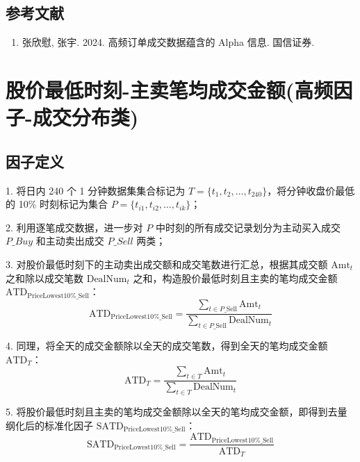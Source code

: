 \documentclass{article}
\begin{document}
\subsection{参考文献}
\begin{enumerate}
    \item 张欣慰, 张宇. 2024. 高频订单成交数据蕴含的 Alpha 信息. 国信证券.
\end{enumerate}

\section{股价最低时刻-主卖笔均成交金额(高频因子-成交分布类)}

\subsection{因子定义}

1. 将日内 240 个 1 分钟数据集集合标记为 \( T = \{t_1, t_2, \dots, t_{240}\} \)，将分钟收盘价最低的 10\% 时刻标记为集合 \( P = \{t_{i1}, t_{i2}, \dots, t_{ik}\} \)；

2. 利用逐笔成交数据，进一步对 \( P \) 中时刻的所有成交记录划分为主动买入成交 \( P\_Buy \) 和主动卖出成交 \( P\_Sell \) 两类；

3. 对股价最低时刻下的主动卖出成交额和成交笔数进行汇总，根据其成交额 \( \mathrm{Amt}_t \) 之和除以成交笔数 \( \mathrm{DealNum}_t \) 之和，构造股价最低时刻且主卖的笔均成交金额 \( \mathrm{ATD}_{\mathrm{PriceLowest10\%\_Sell}} \)：
\begin{equation}
    \mathrm{ATD}_{\mathrm{PriceLowest10\%\_Sell}} = \frac{\sum_{t \in P\_\mathrm{Sell}} \mathrm{Amt}_t}{\sum_{t \in P\_\mathrm{Sell}} \mathrm{DealNum}_t}
\end{equation}

4. 同理，将全天的成交金额除以全天的成交笔数，得到全天的笔均成交金额 \( \mathrm{ATD}_T \)：
\begin{equation}
    \mathrm{ATD}_T = \frac{\sum_{t \in T} \mathrm{Amt}_t}{\sum_{t \in T} \mathrm{DealNum}_t}
\end{equation}

5. 将股价最低时刻且主卖的笔均成交金额除以全天的笔均成交金额，即得到去量纲化后的标准化因子 \( \mathrm{SATD}_{\mathrm{PriceLowest10\%\_Sell}} \)：
\begin{equation}
    \mathrm{SATD}_{\mathrm{PriceLowest10\%\_Sell}} = \frac{\mathrm{ATD}_{\mathrm{PriceLowest10\%\_Sell}}}{\mathrm{ATD}_T}
\end{equation}
\end{document}
